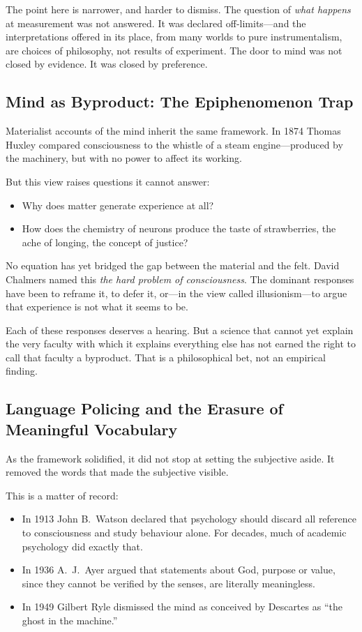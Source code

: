 \documentclass[11pt,a4paper]{article}
\begin{document}
The point here is narrower, and harder to dismiss. The question of \emph{what happens} at measurement was not answered. It was declared off-limits---and the interpretations offered in its place, from many worlds to pure instrumentalism, are choices of philosophy, not results of experiment. The door to mind was not closed by evidence. It was closed by preference.

\subsection{Mind as Byproduct: The Epiphenomenon Trap}

Materialist accounts of the mind inherit the same framework. In 1874 Thomas Huxley compared consciousness to the whistle of a steam engine---produced by the machinery, but with no power to affect its working.

But this view raises questions it cannot answer:

\begin{itemize}
  \item Why does matter generate experience at all?
  \item How does the chemistry of neurons produce the taste of strawberries, the ache of longing, the concept of justice?
\end{itemize}

No equation has yet bridged the gap between the material and the felt. David Chalmers named this \emph{the hard problem of consciousness}. The dominant responses have been to reframe it, to defer it, or---in the view called illusionism---to argue that experience is not what it seems to be.

Each of these responses deserves a hearing. But a science that cannot yet explain the very faculty with which it explains everything else has not earned the right to call that faculty a byproduct. That is a philosophical bet, not an empirical finding.

\subsection{Language Policing and the Erasure of Meaningful Vocabulary}

As the framework solidified, it did not stop at setting the subjective aside. It removed the words that made the subjective visible.

This is a matter of record:

\begin{itemize}
  \item In 1913 John B.~Watson declared that psychology should discard all reference to consciousness and study behaviour alone. For decades, much of academic psychology did exactly that.
  \item In 1936 A.~J.~Ayer argued that statements about God, purpose or value, since they cannot be verified by the senses, are literally meaningless.
  \item In 1949 Gilbert Ryle dismissed the mind as conceived by Descartes as ``the ghost in the machine.''
\end{itemize}
\end{document}
